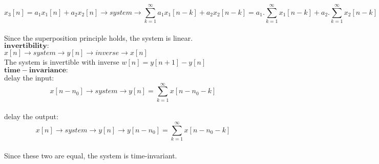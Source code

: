 \documentclass[10pt,a4paper, margin=1in]{article}
\begin{document}
\begin{enumerate}
\begin{enumerate}
    $$x_3[n] = a_1x_1[n] + a_2x_2[n] \rightarrow system \rightarrow\sum_{k=1}^{\infty} a_1x_1[n-k] + a_2x_2[n-k] = a_1.\sum_{k=1}^{\infty} x_1[n-k] + a_2.\sum_{k=1}^{\infty} x_2[n-k]$$ \\
    Since the superposition principle holds, the system is linear. \\
    $\boldsymbol{invertibility:}$ \\
    $x[n] \rightarrow system \rightarrow y[n] \rightarrow inverse \rightarrow x[n]$ \\
    The system is invertible with inverse $w[n] = y[n+1] - y[n]$ \\
    $\boldsymbol{time-invariance:}$ \\
    delay the input:  $$x[n-n_0] \rightarrow system \rightarrow y[n] = \sum_{k=1}^{\infty} x[n-n_0-k]$$ \\
    delay the output: $$x[n] \rightarrow system \rightarrow y[n] \rightarrow y[n-n_0] = \sum_{k=1}^{\infty} x[n-n_0-k]$$ \\
    Since these two are equal, the system is time-invariant.
    \end{enumerate}


\end{enumerate}
\end{document}
